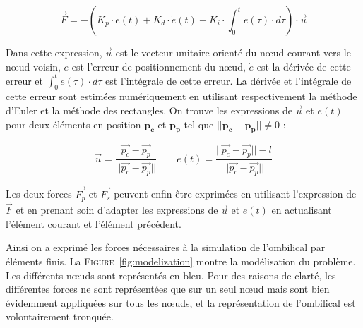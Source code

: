 \begin{description}
\begin{itemize}
						\begin{equation}
							\overrightarrow{F} = - \left(K_p \cdot e(t) + K_d \cdot \dot e(t) + K_i \cdot \int_{0}^te(\tau) \cdot d\tau \right) \cdot \overrightarrow{u}
							\label{eq:pid}
						\end{equation}
						
						Dans cette expression, $\overrightarrow{u}$ est le vecteur unitaire orienté du n\oe ud courant vers le n\oe ud voisin, $e$ est l'erreur de positionnement du n\oe ud, $\dot e$ est la dérivée de cette erreur et $\int_{0}^te(\tau) \cdot d\tau$ est l'intégrale de cette erreur. La dérivée et l'intégrale de cette erreur sont estimées numériquement en utilisant respectivement la méthode d'Euler et la méthode des rectangles. On trouve les expressions de $\overrightarrow{u}$ et $e(t)$ pour deux éléments en position $\mathbf{p_c}$ et $\mathbf{p_p}$ tel que $||\mathbf{p_c} - \mathbf{p_p}|| \neq 0$ :

						\begin{equation}
							\overrightarrow{u} = \frac{\overrightarrow{p_c} - \overrightarrow{p_p}}{||\overrightarrow{p_c} - \overrightarrow{p_p}||} \qquad e(t) = \frac{||\overrightarrow{p_c} - \overrightarrow{p_p}|| - l}{||\overrightarrow{p_c} - \overrightarrow{p_p}||}
							\label{eq:behavioral}
						\end{equation}
						
						Les deux forces $\overrightarrow{F_p}$ et $\overrightarrow{F_s}$ peuvent enfin être exprimées en utilisant l'expression de $\overrightarrow{F}$ et en prenant soin d'adapter les expressions de $\overrightarrow{u}$ et $e(t)$ en actualisant l'élément courant et l'élément précédent.
					\end{itemize}
				\end{description}
			
				Ainsi on a exprimé les forces nécessaires à la simulation de l'ombilical par éléments finis. La \textsc{Figure}~\ref{fig:modelization} montre la modélisation du problème. Les différents n\oe uds sont représentés en bleu. Pour des raisons de clarté, les différentes forces ne sont représentées que sur un seul n\oe ud mais sont bien évidemment appliquées sur tous les n\oe uds, et la représentation de l'ombilical est volontairement tronquée.
			
